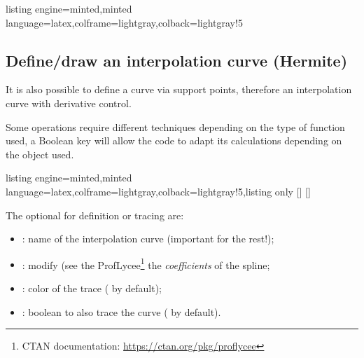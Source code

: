 \documentclass[11pt,a4paper]{ltxdoc}
\begin{document}
\begin{tcblisting}{listing engine=minted,minted language=latex,colframe=lightgray,colback=lightgray!5}
\begin{GraphTikz}%
	[x=0.8cm,y=1cm,Xmin=-7,Xmax=4,Ymin=-3,Ymax=5]
\end{GraphTikz}
\end{tcblisting}

\newpage

\subsection{Define/draw an interpolation curve (Hermite)}\label{deftracfctspline}

It is also possible to define a curve via support points, therefore an interpolation curve with derivative control.

\smallskip

Some operations require different techniques depending on the type of function used, a \textsf{Boolean} key  will allow the code to adapt its calculations depending on the object used.

\begin{tcblisting}{listing engine=minted,minted language=latex,colframe=lightgray,colback=lightgray!5,listing only}
[\macronomspline]
[\macronomspline]
\end{tcblisting}

The optional \MontreCode{[keys]} for definition or tracing are:

\smallskip

\begin{itemize}
	\item {}: name of the interpolation curve (important for the rest!);
	\item {}: modify (see the \textsf{ProfLycee}\footnote{CTAN documentation: \url{https://ctan.org/pkg/proflycee}} the \textit{coefficients} of the spline;
	\item {}: color of the trace ( by default);
	\item {}: boolean to also trace the curve ( by default).
\end{itemize}
\end{document}
